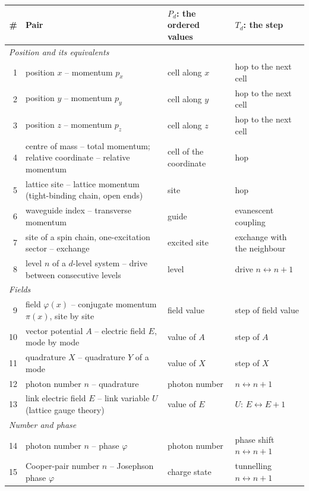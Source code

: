\documentclass[11pt,a4paper]{article}
\begin{document}
\begin{center}
\small
\renewcommand{\arraystretch}{1.2}
\begin{longtable}{r>{\raggedright}p{6.2cm}>{\raggedright}p{3.9cm}>{\raggedright\arraybackslash}p{3.9cm}}
\toprule
\# & Pair & $P_d$: the ordered values & $T_d$: the step \\
\midrule
\endhead
\multicolumn{4}{l}{\emph{Position and its equivalents}} \\
1 & position $x$ -- momentum $p_x$ & cell along $x$ & hop to the next cell \\
2 & position $y$ -- momentum $p_y$ & cell along $y$ & hop to the next cell \\
3 & position $z$ -- momentum $p_z$ & cell along $z$ & hop to the next cell \\
4 & centre of mass -- total momentum; relative coordinate -- relative momentum & cell of the coordinate & hop \\
5 & lattice site -- lattice momentum (tight-binding chain, open ends) & site & hop \\
6 & waveguide index -- transverse momentum & guide & evanescent coupling \\
7 & site of a spin chain, one-excitation sector -- exchange & excited site & exchange with the neighbour \\
8 & level $n$ of a $d$-level system -- drive between consecutive levels & level & drive $n\leftrightarrow n{+}1$ \\
\midrule
\multicolumn{4}{l}{\emph{Fields}} \\
9 & field $\varphi(x)$ -- conjugate momentum $\pi(x)$, site by site & field value & step of field value \\
10 & vector potential $A$ -- electric field $E$, mode by mode & value of $A$ & step of $A$ \\
11 & quadrature $X$ -- quadrature $Y$ of a mode & value of $X$ & step of $X$ \\
12 & photon number $n$ -- quadrature & photon number & $n\leftrightarrow n{+}1$ \\
13 & link electric field $E$ -- link variable $U$ (lattice gauge theory) & value of $E$ & $U$: $E\leftrightarrow E{+}1$ \\
\midrule
\multicolumn{4}{l}{\emph{Number and phase}} \\
14 & photon number $n$ -- phase $\varphi$ & photon number & phase shift $n\leftrightarrow n{+}1$ \\
15 & Cooper-pair number $n$ -- Josephson phase $\varphi$ & charge state & tunnelling $n\leftrightarrow n{+}1$ \\

\end{longtable}
\end{center}
\end{document}
